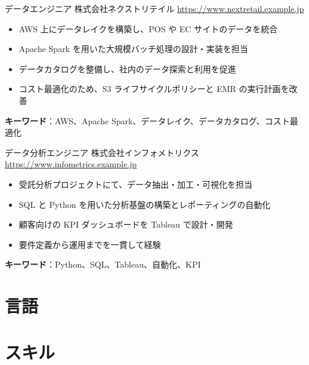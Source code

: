 \documentclass[a4paper, serif, 10pt]{moderncv}
\begin{document}
        {データエンジニア}
        {株式会社ネクストリテイル}
        {\url{https://www.nextretail.example.jp}}
        {}
        {\begin{itemize}
\item AWS 上にデータレイクを構築し、POS や EC サイトのデータを統合
\item Apache Spark を用いた大規模バッチ処理の設計・実装を担当
\item データカタログを整備し、社内のデータ探索と利用を促進
\item コスト最適化のため、S3 ライフサイクルポリシーと EMR の実行計画を改善
\end{itemize}
\textbf{キーワード}：AWS、Apache Spark、データレイク、データカタログ、コスト最適化}

        {データ分析エンジニア}
        {株式会社インフォメトリクス}
        {\url{https://www.infometrics.example.jp}}
        {}
        {\begin{itemize}
\item 受託分析プロジェクトにて、データ抽出・加工・可視化を担当
\item SQL と Python を用いた分析基盤の構築とレポーティングの自動化
\item 顧客向けの KPI ダッシュボードを Tableau で設計・開発
\item 要件定義から運用までを一貫して経験
\end{itemize}
\textbf{キーワード}：Python、SQL、Tableau、自動化、KPI}
\section{言語}

\section{スキル}

\end{document}
